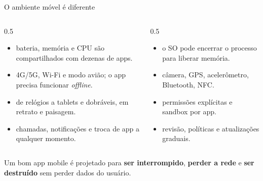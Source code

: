 \documentclass[aspectratio=169,10pt]{beamer}
\begin{document}
\begin{frame}{O ambiente móvel é diferente}
  \begin{columns}[T]
    \begin{column}{0.5\textwidth}
      \begin{itemize}
        \item {} bateria, memória e CPU são compartilhados com dezenas de apps.
        \item {} 4G/5G, Wi-Fi e modo avião; o app precisa funcionar \emph{offline}.
        \item {} de relógios a tablets e dobráveis, em retrato e paisagem.
        \item {} chamadas, notificações e troca de app a qualquer momento.
      \end{itemize}
    \end{column}
    \begin{column}{0.5\textwidth}
      \begin{itemize}
        \item {} o SO pode encerrar o processo para liberar memória.
        \item {} câmera, GPS, acelerômetro, Bluetooth, NFC.
        \item {} permissões explícitas e sandbox por app.
        \item {} revisão, políticas e atualizações graduais.
      \end{itemize}
    \end{column}
  \end{columns}
  \begin{atencao}
    Um bom app mobile é projetado para \textbf{ser interrompido}, \textbf{perder a rede} e \textbf{ser destruído} sem perder dados do usuário.
  \end{atencao}
\end{frame}
\end{document}
